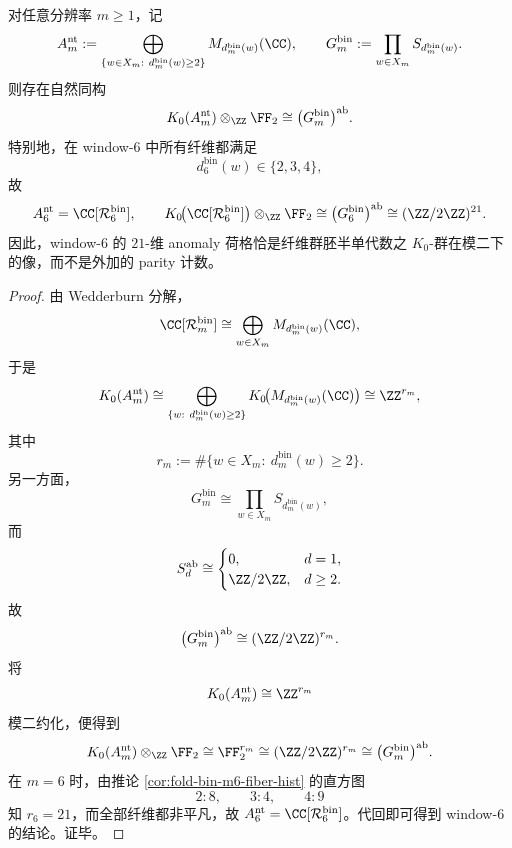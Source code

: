 \begin{theorem}\label{thm:conclusion-foldbin-mod2-k0-anomaly-realization}
对任意分辨率 \(m\ge 1\)，记
\[
A_m^{\mathrm{nt}}
:=
\bigoplus_{\{w\in X_m:\ d_m^{\mathrm{bin}}(w)\ge 2\}}
M_{d_m^{\mathrm{bin}}(w)}(\CC),
\qquad
G_m^{\mathrm{bin}}
:=
\prod_{w\in X_m} S_{d_m^{\mathrm{bin}}(w)}.
\]
则存在自然同构
\[
K_0(A_m^{\mathrm{nt}})\otimes_{\ZZ}\FF_2
\cong
\bigl(G_m^{\mathrm{bin}}\bigr)^{\mathrm{ab}}.
\]
特别地，在 window-\(6\) 中所有纤维都满足
\[
d_6^{\mathrm{bin}}(w)\in\{2,3,4\},
\]
故
\[
A_6^{\mathrm{nt}}=\CC[\mathcal R_6^{\mathrm{bin}}],
\qquad
K_0\!\bigl(\CC[\mathcal R_6^{\mathrm{bin}}]\bigr)\otimes_{\ZZ}\FF_2
\cong
\bigl(G_6^{\mathrm{bin}}\bigr)^{\mathrm{ab}}
\cong
(\ZZ/2\ZZ)^{21}.
\]
因此，window-\(6\) 的 \(21\)-维 anomaly 荷格恰是纤维群胚半单代数之 \(K_0\)-群在模二下的像，而不是外加的 parity 计数。
\end{theorem}
\begin{proof}
由 Wedderburn 分解，
\[
\CC[\mathcal R_m^{\mathrm{bin}}]
\cong
\bigoplus_{w\in X_m}M_{d_m^{\mathrm{bin}}(w)}(\CC),
\]
于是
\[
K_0(A_m^{\mathrm{nt}})
\cong
\bigoplus_{\{w:\ d_m^{\mathrm{bin}}(w)\ge 2\}}
K_0\!\bigl(M_{d_m^{\mathrm{bin}}(w)}(\CC)\bigr)
\cong
\ZZ^{r_m},
\]
其中
\[
r_m:=\#\{w\in X_m:\ d_m^{\mathrm{bin}}(w)\ge 2\}.
\]
另一方面，
\[
G_m^{\mathrm{bin}}
\cong
\prod_{w\in X_m}S_{d_m^{\mathrm{bin}}(w)},
\]
而
\[
S_d^{\mathrm{ab}}
\cong
\begin{cases}
0, & d=1,\\
\ZZ/2\ZZ, & d\ge 2.
\end{cases}
\]
故
\[
\bigl(G_m^{\mathrm{bin}}\bigr)^{\mathrm{ab}}
\cong
(\ZZ/2\ZZ)^{r_m}.
\]
将
\[
K_0(A_m^{\mathrm{nt}})\cong \ZZ^{r_m}
\]
模二约化，便得到
\[
K_0(A_m^{\mathrm{nt}})\otimes_{\ZZ}\FF_2
\cong
\FF_2^{r_m}
\cong
(\ZZ/2\ZZ)^{r_m}
\cong
\bigl(G_m^{\mathrm{bin}}\bigr)^{\mathrm{ab}}.
\]
在 \(m=6\) 时，由推论 \ref{cor:fold-bin-m6-fiber-hist} 的直方图
\[
2:8,\qquad 3:4,\qquad 4:9
\]
知 \(r_6=21\)，而全部纤维都非平凡，故 \(A_6^{\mathrm{nt}}=\CC[\mathcal R_6^{\mathrm{bin}}]\)。代回即可得到 window-\(6\) 的结论。证毕。
\end{proof}

